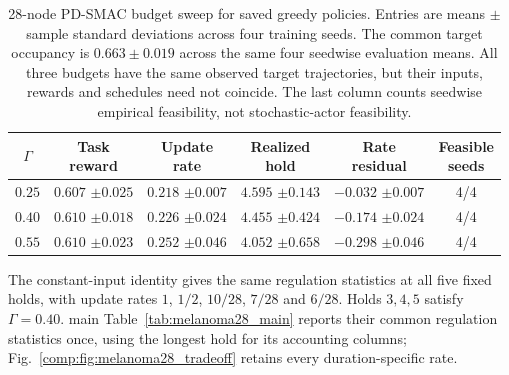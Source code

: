 \documentclass[11pt]{article}
\newcommand{\1}{\mathbf{1}}
\begin{document}
\begin{table}[htbp]
\caption{28-node PD-SMAC budget sweep for saved greedy policies. Entries are means $\pm$ sample standard deviations across four training seeds. The common target occupancy is $0.663\pm0.019$ across the same four seedwise evaluation means. All three budgets have the same observed target trajectories, but their inputs, rewards and schedules need not coincide. The last column counts seedwise empirical feasibility, not stochastic-actor feasibility.}
\label{comp:tab:melanoma28_budget_sweep}
\centering
\begingroup
\fontsize{8}{10}\selectfont
\setlength{\tabcolsep}{2pt}
\renewcommand{\arraystretch}{1.14}
\begin{tabular*}{\linewidth}{@{\extracolsep{\fill}}cccccc@{}}
\toprule
$\Gamma$ & \shortstack{Task\\reward} & \shortstack{Update\\rate} & \shortstack{Realized\\hold} & \shortstack{Rate\\residual} & \shortstack{Feasible\\seeds} \\
\midrule
$0.25$ & \shortstack{$0.607$\\$\pm0.025$} & \shortstack{$0.218$\\$\pm0.007$} & \shortstack{$4.595$\\$\pm0.143$} & \shortstack{$-0.032$\\$\pm0.007$} & 4/4 \\[2pt]
$0.40$ & \shortstack{$0.610$\\$\pm0.018$} & \shortstack{$0.226$\\$\pm0.024$} & \shortstack{$4.455$\\$\pm0.424$} & \shortstack{$-0.174$\\$\pm0.024$} & 4/4 \\[2pt]
$0.55$ & \shortstack{$0.610$\\$\pm0.023$} & \shortstack{$0.252$\\$\pm0.046$} & \shortstack{$4.052$\\$\pm0.658$} & \shortstack{$-0.298$\\$\pm0.046$} & 4/4 \\[2pt]
\bottomrule
\end{tabular*}
\endgroup
\end{table}

The constant-input identity gives the same regulation statistics at all five fixed holds, with update rates $1$, $1/2$, $10/28$, $7/28$ and $6/28$. Holds $3,4,5$ satisfy $\Gamma=0.40$. main Table~\ref*{tab:melanoma28_main} reports their common regulation statistics once, using the longest hold for its accounting columns; Fig.~\ref{comp:fig:melanoma28_tradeoff} retains every duration-specific rate.
\end{document}
